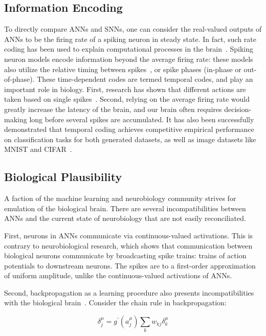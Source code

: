 \documentclass[fyp]{socreport}
\begin{document}
\subsection{Information Encoding}

To directly compare ANNs and SNNs, one can consider the real-valued outputs of
ANNs to be the firing rate of a spiking neuron in steady state. In fact, such
rate coding has been used to explain computational processes in the
brain~\cite{pfeiffer2018deep}. Spiking neuron models encode information beyond
the average firing rate: these models also utilize the relative timing between
spikes~\cite{guetig14_to_spike_or_when_to_spike}, or spike phases (in-phase or
out-of-phase). These time-dependent codes are termed temporal codes, and play an
important role in biology. First, research has shown that different actions are
taken based on single spikes~\cite{stemmler96_singl_spike_suffic}. Second,
relying on the average firing rate would greatly increase the latency of the
brain, and our brain often requires decision-making long before several spikes
are accumulated.  It has also been successfully demonstrated that temporal
coding achieves competitive empirical performance on classification tasks for
both generated datasets, as well as image datasets like MNIST and
CIFAR~\cite{comsa19_tempor_codin_spikin_neural_networ}.

\subsection{Biological Plausibility\label{bioplausible}}

A faction of the machine learning and neurobiology community strives for
emulation of the biological brain. There are several incompatibilities between
ANNs and the current state of neurobiology that are not easily reconciliated.

First, neurons in ANNs communicate via continuous-valued activations.  This is
contrary to neurobiological research, which shows that communication between
biological neurons communicate by broadcasting spike trains: trains of action
potentials to downstream neurons. The spikes are to a first-order approximation
of uniform amplitude, unlike the continuous-valued activations of ANNs.

Second, backpropagation as a learning procedure also presents incompatibilities
with the biological brain~\cite{TAVANAEI201947}.  Consider the chain rule in
backpropagation:

\begin{equation} \label{chainrule} \delta_{j}^{\mu}=g^{\prime}\left(a_{j}^{\mu}\right) \sum_{k} w_{k j} \delta_{k}^{\mu}
\end{equation}
\end{document}
